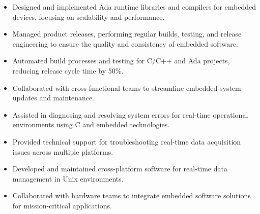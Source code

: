 \par\smallskip
\noindent
\begin{minipage}{20cm}
  \begin{minipage}{9.75cm}
    \begin{itemize}
      \item Designed and implemented Ada runtime libraries and compilers for embedded devices, focusing on scalability and performance.
      \item Managed product releases, performing regular builds, testing, and release engineering to ensure the quality and consistency of embedded software.
    \end{itemize}
  \end{minipage}
  \hfill
  \begin{minipage}{9.75cm}
    \begin{itemize}
      \item Automated build processes and testing for C/C++ and Ada projects, reducing release cycle time by 50\%.
      \item Collaborated with cross-functional teams to streamline embedded system updates and maintenance.
    \end{itemize}
  \end{minipage}
\end{minipage}
\par\smallskip
\divider

\par\smallskip
\noindent
\begin{minipage}{20cm}
  \begin{minipage}{9.75cm}
    \begin{itemize}
      \item Assisted in diagnosing and resolving system errors for real-time operational environments using C and embedded technologies.
      \item Provided technical support for troubleshooting real-time data acquisition issues across multiple platforms.
    \end{itemize}
  \end{minipage}
  \hfill
  \begin{minipage}{9.75cm}
    \begin{itemize}
      \item Developed and maintained cross-platform software for real-time data management in Unix environments.
      \item Collaborated with hardware teams to integrate embedded software solutions for mission-critical applications.
    \end{itemize}
  \end{minipage}
\end{minipage}

